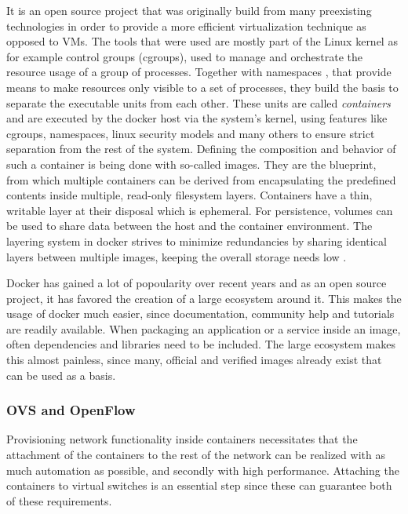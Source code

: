 It is an open source project that was originally build from many preexisting technologies in order to provide a more efficient virtualization technique as opposed to VMs. The tools that were used are mostly part of the Linux kernel as for example control groups (cgroups), used to manage and orchestrate the resource usage of a group of processes. Together with namespaces , that provide means to make resources only visible to a set of processes, they build the basis to separate the executable units from each other. These units are called \textit{containers} and are executed by the docker host via the system's kernel, using features like cgroups, namespaces, linux security models and many others to ensure strict separation from the rest of the system. Defining the composition and behavior of such a container is being done with so-called images. They are the blueprint, from which multiple containers can be derived from encapsulating the predefined contents inside multiple, read-only filesystem layers. Containers have a thin, writable layer at their disposal which is ephemeral. For persistence, volumes can be used to share data between the host and the container environment. The layering system in docker strives to minimize redundancies by sharing identical layers between multiple images, keeping the overall storage needs low \cite{fink2014docker} \cite{morabito2015hypervisors}.

Docker has gained a lot of popoularity over recent years and as an open source project, it has favored the creation of a large ecosystem around it. This makes the usage of docker much easier, since documentation, community help and tutorials are readily available. When packaging an application or a service inside an image, often dependencies and libraries need to be included. The large ecosystem makes this almost painless, since many, official and verified images already exist that can be used as a basis.

\subsubsection{OVS and OpenFlow}
Provisioning network functionality inside containers necessitates that the attachment of the containers to the rest of the network can be realized with as much automation as possible, and secondly with high performance. Attaching the containers to virtual switches is an essential step since these can guarantee both of these requirements. 

